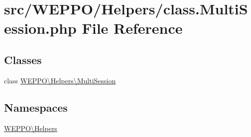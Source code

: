 \hypertarget{class_8MultiSession_8php}{}\section{src/\+W\+E\+P\+P\+O/\+Helpers/class.Multi\+Session.\+php File Reference}
\label{class_8MultiSession_8php}
\subsection*{Classes}
\begin{DoxyCompactItemize}
\item 
class \hyperlink{classWEPPO_1_1Helpers_1_1MultiSession}{W\+E\+P\+P\+O\textbackslash{}\+Helpers\textbackslash{}\+Multi\+Session}
\end{DoxyCompactItemize}
\subsection*{Namespaces}
\begin{DoxyCompactItemize}
\item 
 \hyperlink{namespaceWEPPO_1_1Helpers}{W\+E\+P\+P\+O\textbackslash{}\+Helpers}
\end{DoxyCompactItemize}
